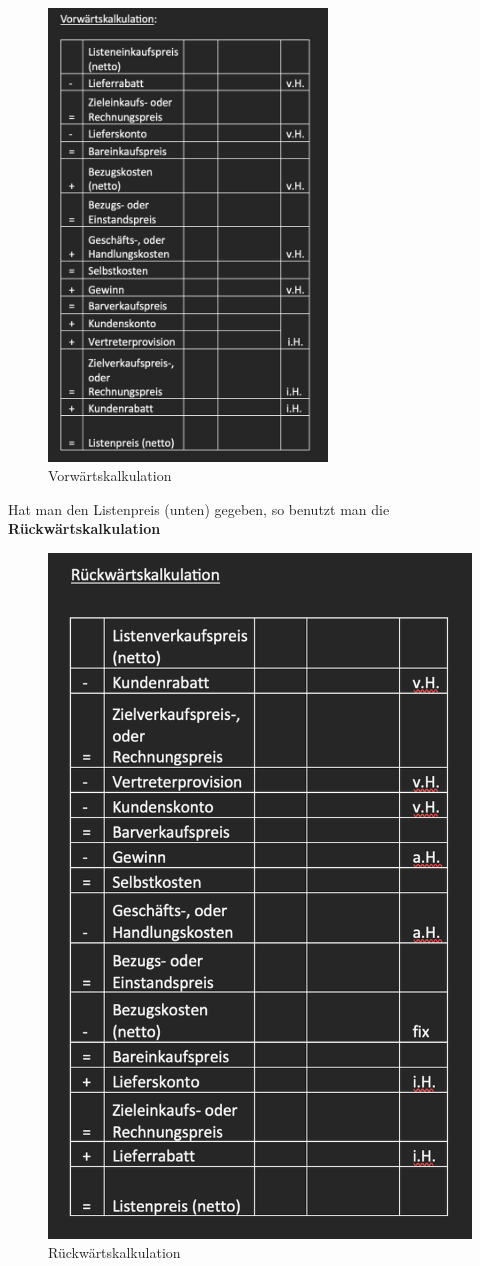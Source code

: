 \documentclass[10pt]{article}
\begin{document}
\begin{figure}[H]
\begin{center}
  \includegraphics[height=12cm]{kalkV.png}
  \end{center}
  \caption{Vorwärtskalkulation}
  \label{fig:Vorwärtskalkulation}
\end{figure}
Hat man den Listenpreis (unten) gegeben, so benutzt man die \textbf{R\"uckw\"artskalkulation}
\begin{figure}[H]
\begin{center}
  \includegraphics[height=12cmm]{kalkR.png}
  \end{center}
  \caption{Rückwärtskalkulation}
  \label{fig:Rückwärtskalkulation}
\end{figure}
\end{document}
